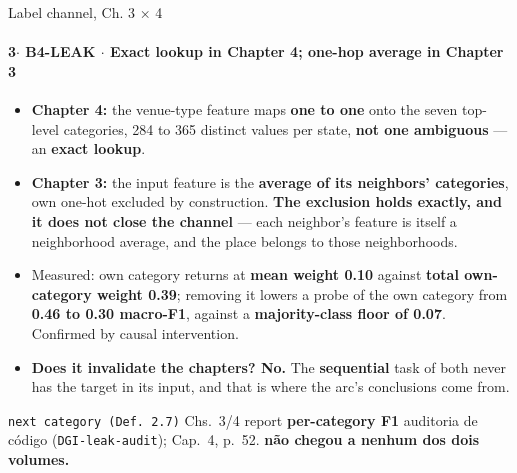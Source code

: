 \documentclass{beamer}
\begin{document}
\begin{frame}[noframenumbering]{Label channel, Ch. 3 × 4}
    \framesubtitle{\normalsize 3$\cdot$ \textbf{B4-LEAK} $\cdot$ Exact lookup in Chapter 4; one-hop average in Chapter 3}
    \hypertarget{b4leak}{}
    \small\begin{itemize}\setlength{\itemsep}{0pt}\setlength{\parskip}{0pt}
        \item \textbf{Chapter 4:} the venue-type feature maps \textbf{one to one} onto the seven top-level categories, 284 to 365 distinct values per state, \textbf{not one ambiguous} --- an \textbf{exact lookup}.
        \item \textbf{Chapter 3:} the input feature is the \textbf{average of its neighbors' categories}, own one-hot excluded by construction. \textbf{The exclusion holds exactly, and it does not close the channel} --- each neighbor's feature is itself a neighborhood average, and the place belongs to those neighborhoods.
        \item Measured: own category returns at \textbf{mean weight 0.10} against \textbf{total own-category weight 0.39}; removing it lowers a probe of the own category from \textbf{0.46 to 0.30 macro-F1}, against a \textbf{majority-class floor of 0.07}. Confirmed by causal intervention.
        \item \textcolor{alert}{\textbf{Does it invalidate the chapters? No.}} The \textbf{sequential} task of both never has the target in its input, and that is where the arc's conclusions come from.
    \end{itemize}
    \vfill
    {\scriptsize\texttt{next category (Def.~2.7)} \textbullet{} Chs.~3/4 report \textbf{per-category F1} \textbullet{} \textcolor{black!70}{auditoria de código (\texttt{DGI-leak-audit}); Cap.~4, p.~52. \textbf{não chegou a nenhum dos dois volumes.}}\hfill\hyperlink{b0}{}}
\end{frame}
\end{document}
